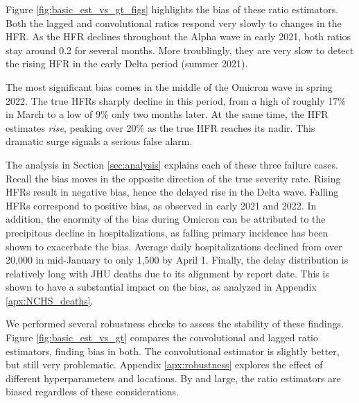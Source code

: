 \documentclass{article}
\newcommand{\ahcomment}[1]{{\color{red}[AH: #1]}}
\begin{document}
Figure \ref{fig:basic_est_vs_gt_figs} highlights the bias of these ratio estimators. Both the lagged and convolutional ratios respond very slowly to changes in the HFR. As the HFR declines throughout the Alpha wave in early 2021, both ratios stay around 0.2 for several months. More troublingly, they are very slow to detect the rising HFR in the early Delta period (summer 2021). %

The most significant bias comes in the middle of the Omicron wave in spring 2022. The true HFRs sharply decline in this period, from a high of roughly 17\% in March to a low of 9\% only two months later. At the same time, the HFR estimates \textit{rise}, peaking over 20\% as the true HFR reaches its nadir. This dramatic surge signals a serious false alarm. 

The analysis in Section \ref{sec:analysis} explains each of these three failure cases. Recall the bias moves in the opposite direction of the true severity rate. Rising HFRs result in negative bias, hence the delayed rise in the Delta wave. Falling HFRs correspond to positive bias, as observed in early 2021 and 2022. In addition, the enormity of the bias during Omicron can be attributed to the precipitous decline in hospitalizations, as falling primary incidence has been shown to exacerbate the bias. Average daily hospitalizations declined from over 20,000 in mid-January to only 1,500 by April 1. Finally, the delay distribution is relatively long with JHU deaths due to its alignment by report date. This is shown to have a substantial impact on the bias, as analyzed in Appendix \ref{apx:NCHS_deaths}.

We performed several robustness checks to assess the stability of these findings. Figure \ref{fig:basic_est_vs_gt} compares the convolutional and lagged ratio estimators, finding bias in both. The convolutional estimator is slightly better, but still very problematic. Appendix \ref{apx:robustness} explores the effect of different hyperparameters and locations. By and large, the ratio estimators are biased regardless of these considerations. 
\end{document}
